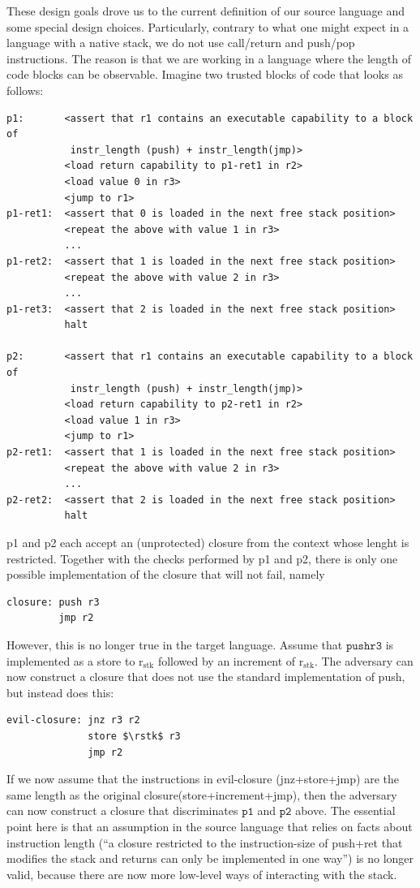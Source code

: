 \documentclass[a4paper]{article}
\newcommand{\sourcecolor}[1]{\color{blue}}
\newcommand{\targetcolor}[1]{\color{black}}
\newcommand{\rstk}{\mathrm{r}_\mathrm{stk}}
\begin{document}
These design goals drove us to the current definition of our source language and some special design choices.
Particularly, contrary to what one might expect in a language with a native stack, we do not use call/return and push/pop instructions.
The reason is that we are working in a language where the length of code blocks can be observable.
Imagine two trusted blocks of code that looks as follows:
\begin{lstlisting}[basicstyle=\sourcecolor{}\ttfamily] 
p1:       <assert that r1 contains an executable capability to a block of 
           instr_length (push) + instr_length(jmp)>
          <load return capability to p1-ret1 in r2>
          <load value 0 in r3>
          <jump to r1>
p1-ret1:  <assert that 0 is loaded in the next free stack position>
          <repeat the above with value 1 in r3>
          ...
p1-ret2:  <assert that 1 is loaded in the next free stack position>
          <repeat the above with value 2 in r3>
          ...
p1-ret3:  <assert that 2 is loaded in the next free stack position>
          halt

p2:       <assert that r1 contains an executable capability to a block of 
           instr_length (push) + instr_length(jmp)>
          <load return capability to p2-ret1 in r2>
          <load value 1 in r3>
          <jump to r1>
p2-ret1:  <assert that 1 is loaded in the next free stack position>
          <repeat the above with value 2 in r3>
          ...
p2-ret2:  <assert that 2 is loaded in the next free stack position>
          halt
\end{lstlisting}

p1 and p2 each accept an (unprotected) closure from the context whose lenght is restricted.
Together with the checks performed by p1 and p2, there is only one possible implementation of the closure that will not fail, namely
\begin{lstlisting}[basicstyle=\sourcecolor{}\ttfamily] 
closure: push r3
         jmp r2
\end{lstlisting}

However, this is no longer true in the target language.
Assume that $\mathtt{push r3}$ is implemented as a store to $\rstk$ followed by an increment of $\rstk$.
The adversary can now construct a closure that does not use the standard implementation of push, but instead does this:
\begin{lstlisting}[basicstyle=\targetcolor{}\ttfamily] 
evil-closure: jnz r3 r2
              store $\rstk$ r3
              jmp r2
\end{lstlisting}
If we now assume that the instructions in evil-closure (jnz+store+jmp) are the same length as the original closure(store+increment+jmp), then the adversary can now construct a closure that discriminates $\mathtt{p1}$ and $\mathtt{p2}$ above.
The essential point here is that an assumption in the source language that relies on facts about instruction length (``a closure restricted to the instruction-size of push+ret that modifies the stack and returns can only be implemented in one way'') is no longer valid, because there are now more low-level ways of interacting with the stack.
\end{document}
